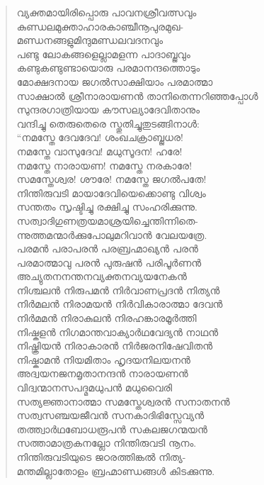 \begin{verse}
വ്യക്തമായിരിപ്പൊരു പാവനശ്രീവത്സവും\\
കുണ്ഡലമുക്താഹാരകാഞ്ചീനൂപുരമുഖ-\\
മണ്ഡനങ്ങളുമിന്ദുമണ്ഡലവദനവും\\
പണ്ടു ലോകങ്ങളെല്ലാമളന്ന പാദാബ്ജവും\\
കണ്ടുകണ്ടുണ്ടായൊരു പരമാനന്ദത്തൊടും\\
മോക്ഷദനായ ജഗല്‍സാക്ഷിയാം പരമാത്മാ\\
സാക്ഷാല്‍ ശ്രീനാരായണന്‍ താനിതെന്നറിഞ്ഞപ്പോള്‍\\
സുന്ദരഗാത്രിയായ കൗസല്യാദേവിതാനും\\
വന്ദിച്ചു തെരുതെരെ സ്തുതിച്ചുതുടങ്ങിനാള്‍:\\
“നമസ്തേ ദേവദേവ! ശംഖചക്രാബ്ജധര!\\
നമസ്തേ വാസുദേവ! മധുസൂദന! ഹരേ!\\
നമസ്തേ നാരായണ! നമസ്തേ നരകാരേ!\\
സമസ്തേശ്വര! ശൗരേ! നമസ്തേ ജഗല്‍പതേ!\\
നിന്തിരുവടി മായാദേവിയെക്കൊണ്ടു വിശ്വം\\
സന്തതം സൃഷ്ടിച്ചു രക്ഷിച്ചു സംഹരിക്കുന്നു.\\
സത്വാദിഗുണത്രയമാശ്രയിച്ചെന്തിന്നിതെ-\\
ന്നുത്തമന്മാര്‍ക്കുപോലുമറിവാന്‍ വേലയത്രേ.\\
പരമന്‍ പരാപരന്‍ പരബ്രഹ്മാഖ്യന്‍ പരന്‍\\
പരമാത്മാവു പരന്‍ പുരുഷന്‍ പരിപൂര്‍ണന്‍\\
അച്യുതനനന്തനവ്യക്തനവ്യയനേകന്‍\\
നിശ്ചലന്‍ നിരുപമന്‍ നിര്‍വാണപ്രദന്‍ നിത്യന്‍\\
നിര്‍മലന്‍ നിരാമയന്‍ നിര്‍വികാരാത്മാ ദേവന്‍\\
നിര്‍മമന്‍ നിരാകുലന്‍ നിരഹങ്കാരമൂര്‍ത്തി\\
നിഷ്കളന്‍ നിഗമാന്തവാക്യാര്‍ഥവേദ്യന്‍ നാഥന്‍\\
നിഷ്ക്രിയന്‍ നിരാകാരന്‍ നിര്‍ജരനിഷേവിതന്‍\\
നിഷ്കാമന്‍ നിയമിതാം ഹൃദയനിലയനന്‍\\
അദ്വയനജനമൃതാനന്ദന്‍ നാരായണന്‍\\
വിദ്വന്മാനസപദ്മമധുപന്‍ മധുവൈരി\\
സത്യജ്ഞാനാത്മാ സമസ്തേശ്വരന്‍ സനാതനന്‍\\
സത്വസഞ്ചയജീവന്‍ സനകാദിഭിസ്സേവ്യന്‍\\
തത്ത്വാര്‍ഥബോധരൂപന്‍ സകലജഗന്മയന്‍\\
സത്താമാത്രകനല്ലോ നിന്തിരുവടി നൂനം.\\
നിന്തിരുവടിയുടെ ജഠരത്തിങ്കല്‍ നിത്യ-\\
മന്തമില്ലാതോളം ബ്രഹ്മാണ്ഡങ്ങള്‍ കിടക്കുന്നു.\\

\end{verse}
